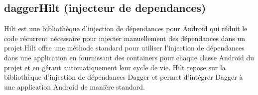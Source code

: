 \subsection{daggerHilt (injecteur de dependances)}
Hilt est une bibliothèque d'injection de dépendances pour Android qui réduit le code récurrent nécessaire pour injecter manuellement des dépendances dans un projet.Hilt offre une méthode standard pour utiliser l'injection de dépendances dans une application en fournissant des containers pour chaque classe Android du projet et en gérant automatiquement leur cycle de vie. 
Hilt repose sur la bibliothèque d'injection de dépendances Dagger et permet d'intégrer Dagger à une application Android de manière standard.
\cite{androidInjectionDpendances}

